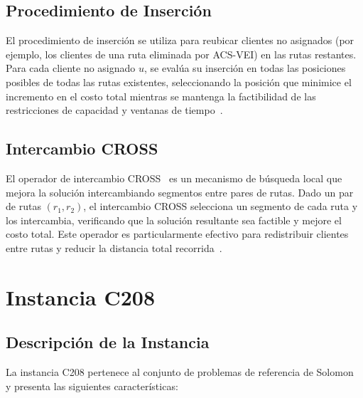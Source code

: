 \documentclass[12pt, letterpaper]{article}
\begin{document}
\subsection{Procedimiento de Inserción}
\label{subsec:insercion}

El procedimiento de inserción se utiliza para reubicar clientes no asignados (por ejemplo, los clientes de una ruta eliminada por ACS-VEI) en las rutas restantes. Para cada cliente no asignado $u$, se evalúa su inserción en todas las posiciones posibles de todas las rutas existentes, seleccionando la posición que minimice el incremento en el costo total mientras se mantenga la factibilidad de las restricciones de capacidad y ventanas de tiempo~\cite{gambardella1999, solomon1987}.

\subsection{Intercambio CROSS}
\label{subsec:cross}

El operador de intercambio CROSS~\cite{taillard1997, rochat1995} es un mecanismo de búsqueda local que mejora la solución intercambiando segmentos entre pares de rutas. Dado un par de rutas $(r_1, r_2)$, el intercambio CROSS selecciona un segmento de cada ruta y los intercambia, verificando que la solución resultante sea factible y mejore el costo total. Este operador es particularmente efectivo para redistribuir clientes entre rutas y reducir la distancia total recorrida~\cite{gambardella1999}.

\newpage
\section{Instancia C208}
\label{sec:instancia_c208}

\subsection{Descripción de la Instancia}
\label{subsec:descripcion_instancia}

La instancia C208 pertenece al conjunto de problemas de referencia de Solomon~\cite{solomon1987} y presenta las siguientes características:
\end{document}
